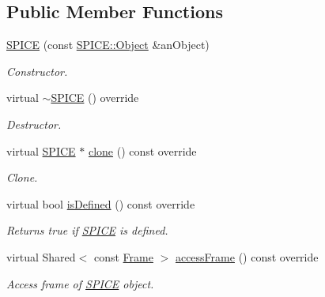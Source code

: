 \subsection*{Public Member Functions}
\begin{DoxyCompactItemize}
\item 
\hyperlink{classostk_1_1physics_1_1env_1_1ephem_1_1_s_p_i_c_e_a47224d4625f6574ed2b9681f7bfa9c31}{S\+P\+I\+CE} (const \hyperlink{classostk_1_1physics_1_1env_1_1ephem_1_1_s_p_i_c_e_ae84db78d858cdd0a1dc3ff53090f4a1f}{S\+P\+I\+C\+E\+::\+Object} \&an\+Object)
\begin{DoxyCompactList}\small\item\em Constructor. \end{DoxyCompactList}\item 
virtual \hyperlink{classostk_1_1physics_1_1env_1_1ephem_1_1_s_p_i_c_e_abd2e7f60841f6600b4bca015dd50df3d}{$\sim$\+S\+P\+I\+CE} () override
\begin{DoxyCompactList}\small\item\em Destructor. \end{DoxyCompactList}\item 
virtual \hyperlink{classostk_1_1physics_1_1env_1_1ephem_1_1_s_p_i_c_e}{S\+P\+I\+CE} $\ast$ \hyperlink{classostk_1_1physics_1_1env_1_1ephem_1_1_s_p_i_c_e_af9155765c2546bd8707b56ed86f77c2d}{clone} () const override
\begin{DoxyCompactList}\small\item\em Clone. \end{DoxyCompactList}\item 
virtual bool \hyperlink{classostk_1_1physics_1_1env_1_1ephem_1_1_s_p_i_c_e_a2e5350a46c5efe938998b760ee783f77}{is\+Defined} () const override
\begin{DoxyCompactList}\small\item\em Returns true if \hyperlink{classostk_1_1physics_1_1env_1_1ephem_1_1_s_p_i_c_e}{S\+P\+I\+CE} is defined. \end{DoxyCompactList}\item 
virtual Shared$<$ const \hyperlink{classostk_1_1physics_1_1coord_1_1_frame}{Frame} $>$ \hyperlink{classostk_1_1physics_1_1env_1_1ephem_1_1_s_p_i_c_e_abf9dee32d47dbb1308af0c9783c84854}{access\+Frame} () const override
\begin{DoxyCompactList}\small\item\em Access frame of \hyperlink{classostk_1_1physics_1_1env_1_1ephem_1_1_s_p_i_c_e}{S\+P\+I\+CE} object. \end{DoxyCompactList}\end{DoxyCompactItemize}
